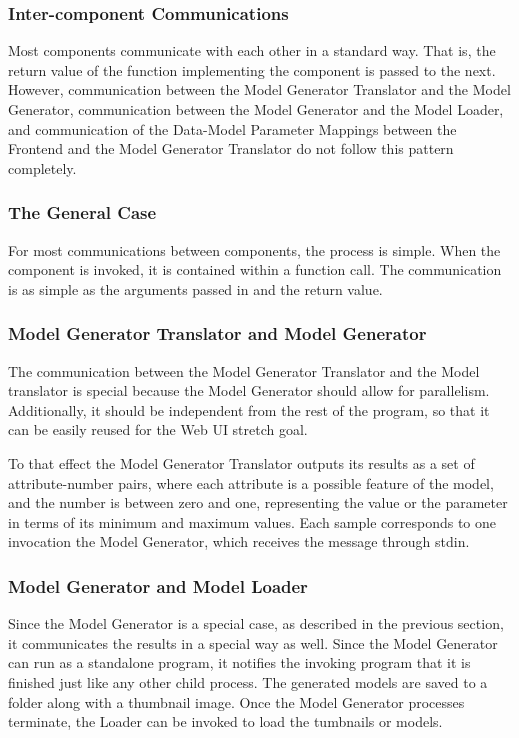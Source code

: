 \documentclass[letterpaper,10pt, onecolumn, draftclsnofoot]{IEEEtran}
\begin{document}
\subsubsection{Inter-component Communications}
Most components communicate with each other in a standard way. That is, the return value of the function implementing the component is passed to the next. However, communication between the Model Generator Translator and the Model Generator, communication between the Model Generator and the Model Loader, and communication of the Data-Model Parameter Mappings between the Frontend and the Model Generator Translator do not follow this pattern completely.

\subsubsection{The General Case}
For most communications between components, the process is simple. When the component is invoked, it is contained within a function call. The communication is as simple as the arguments passed in and the return value.

\subsubsection{Model Generator Translator and Model Generator}
The communication between the Model Generator Translator and the Model translator is special because the Model Generator should allow for parallelism. Additionally, it should be independent from the rest of the program, so that it can be easily reused for the Web UI stretch goal. 

To that effect the Model Generator Translator outputs its results as a set of attribute-number pairs, where each attribute is a possible feature of the model, and the number is between zero and one, representing the value or the parameter in terms of its minimum and maximum values. Each sample corresponds to one invocation the Model Generator, which receives the message through stdin. 

\subsubsection{Model Generator and Model Loader}
Since the Model Generator is a special case, as described in the previous section, it communicates the results in a special way as well.
Since the Model Generator can run as a standalone program, it notifies the invoking program that it is finished just like any other child process. The generated models are saved to a folder along with a thumbnail image. Once the Model Generator processes terminate, the Loader can be invoked to load the tumbnails or models.
\end{document}
